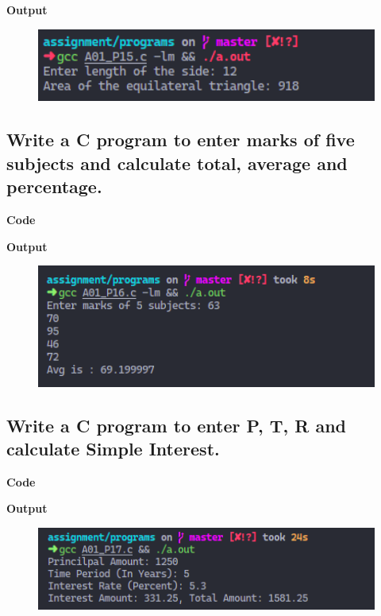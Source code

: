 \documentclass[a4paper]{article}
\begin{document}


\textbf{Output}

\begin{figure}[h]
  \includegraphics[width=12cm]{A01_P15}
\end{figure}

\newpage



\subsection{Write a C program to enter marks of five subjects and calculate total, average and percentage.}
\textbf{Code}



\textbf{Output}

\begin{figure}[h]
  \includegraphics[width=12cm]{A01_P16}
\end{figure}

\newpage



\subsection{Write a C program to enter P, T, R and calculate Simple Interest.}
\textbf{Code}



\textbf{Output}

\begin{figure}[h]
  \includegraphics[width=12cm]{A01_P17}
\end{figure}
\end{document}
